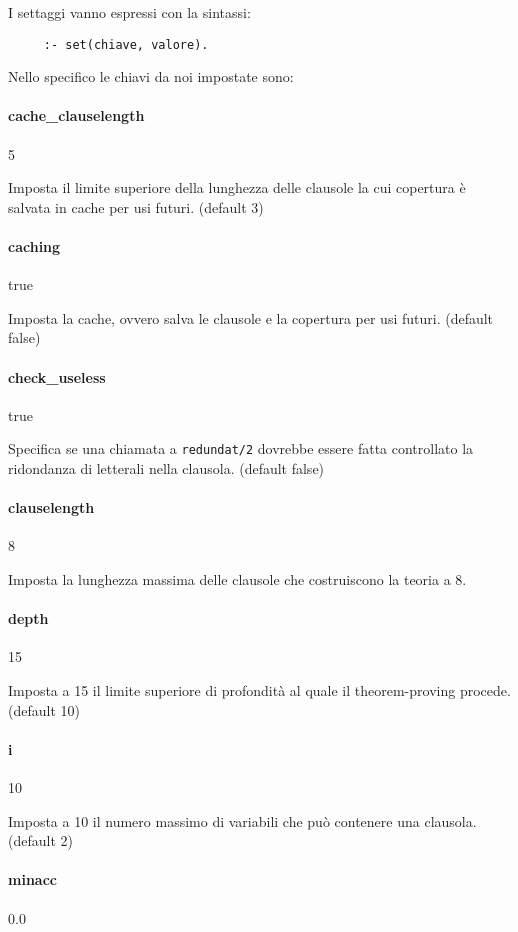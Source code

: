 I settaggi vanno espressi con la sintassi:
\begin{verbatim}
     :- set(chiave, valore).
\end{verbatim}

Nello specifico le chiavi da noi impostate sono:

\paragraph{cache\_clauselength} 5

Imposta il limite superiore della lunghezza delle clausole la cui copertura è salvata in cache per usi futuri. (default 3)

\paragraph{caching} true

 Imposta la cache, ovvero salva le clausole e la copertura per usi futuri. (default false)

\paragraph{check\_useless}   true

Specifica se una chiamata a \verb+redundat/2+ dovrebbe essere fatta controllato la ridondanza di letterali nella clausola. (default false)

\paragraph{clauselength}   8

   Imposta la lunghezza massima delle clausole che costruiscono la teoria a 8.
 
\paragraph{depth}   15

   Imposta a 15 il limite superiore di profondità al quale il theorem-proving procede. (default 10) 

\paragraph{i}   10

Imposta a 10 il numero massimo di variabili che può contenere una clausola. (default 2)

\paragraph{minacc}   0.0

